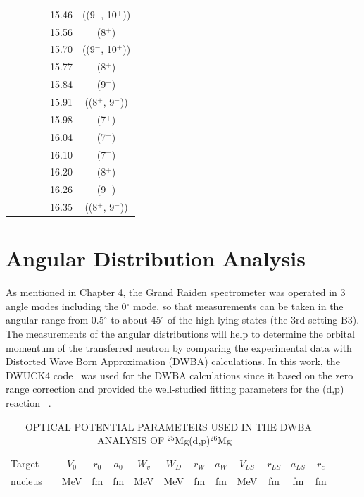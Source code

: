 {\begin{center}
\begin{longtable}{cc cc cc}
  &   &   &   & 15.46 &   ((9$^-$, 10$^+$))       \\
  &   &   &   & 15.56 &   (8$^+$)                 \\
  &   &   &   & 15.70 &   ((9$^-$, 10$^+$))       \\
  &   &   &   & 15.77 &   (8$^+$)                 \\
  &   &   &   & 15.84 &   (9$^-$)                 \\
  &   &   &   & 15.91 &   ((8$^+$, 9$^-$))        \\
  &   &   &   & 15.98 &   (7$^+$)                 \\
  &   &   &   & 16.04 &   (7$^-$)                 \\
  &   &   &   & 16.10 &   (7$^-$)                 \\
  &   &   &   & 16.20 &   (8$^+$)                 \\
  &   &   &   & 16.26 &   (9$^-$)                 \\
  &   &   &   & 16.35 &   ((8$^+$, 9$^-$))        \\

    \end{longtable}
\end{center}




\section{Angular Distribution Analysis}
As mentioned in Chapter 4, the Grand Raiden spectrometer was operated in 3 angle modes including the 0$^{\circ}$ mode, so that measurements can be taken in the angular range from 0.5$^{\circ}$ to about 45$^{\circ}$ of the high-lying states (the 3rd setting B3). The measurements of the angular distributions will help to determine the orbital momentum of the transferred neutron by comparing the experimental data with   Distorted Wave Born Approximation (DWBA) calculations. In this work, the DWUCK4 code~\citep{DWUCK4} was used for the DWBA calculations since it based on the zero range correction and provided the well-studied fitting parameters for the (d,p) reaction ~\citep{DWUCK4}.

\begin{center}
  \begin{longtable}{lcccccccccccc}
    \caption{OPTICAL POTENTIAL  PARAMETERS  USED IN THE DWBA ANALYSIS OF $^{25}$Mg(d,p)$^{26}$Mg ~\citep{HATANAKA1984530} \label{tbl:opticalpotential}\/}\\
        \toprule
        \toprule
         Target  &  & $V_0$   & $r_0$  & $a_0$   &  $W_v$  & $W_D$  & $r_W$ & $a_W$  & $V_{LS}$  & $r_{LS}$ & $a_{LS}$ & $r_c$  \\
         nucleus &  &  MeV  &  fm  & fm    &   MeV & MeV  & fm  & fm   &  MeV    &   fm   &   fm   & fm \\
        \midrule
\endfirsthead


\end{longtable}
\end{center}}
